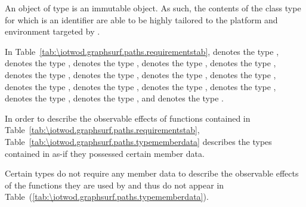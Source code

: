 \pnum
\begin{note}
An object of type  is an immutable object. As such, the contents of the class type for which  is an identifier are able to be highly tailored to the platform and environment targeted by .
\end{note}

\pnum
In Table~\ref{tab:\iotwod.graphsurf.paths.requirementstab},  denotes the type ,  denotes the type ,  denotes the type ,  denotes the type ,  denotes the type ,  denotes the type ,  denotes the type ,  denotes the type ,  denotes the type ,  denotes the type ,  denotes the type ,  denotes the type ,  denotes the type ,  denotes the type ,  denotes the type , and  denotes the type .

\pnum
In order to describe the observable effects of functions contained in Table~\ref{tab:\iotwod.graphsurf.paths.requirementstab}, Table~\ref{tab:\iotwod.graphsurf.paths.typememberdata} describes the types contained in  as-if they possessed certain member data. 

\pnum
\begin{note}
Certain types do not require any member data to describe the observable effects of the functions they are used by and thus do not appear in Table~(\ref{tab:\iotwod.graphsurf.paths.typememberdata}).
\end{note}

